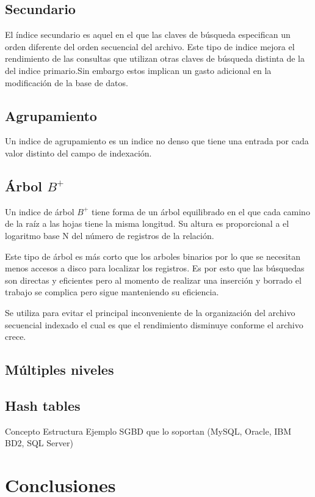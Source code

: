 \documentclass[12pt, titlepage]{article}
\begin{document}
	\subsection{Secundario}
	El índice secundario es aquel en el que las claves de búsqueda especifican un orden diferente del orden secuencial del archivo.
	Este tipo de indice mejora el rendimiento de las consultas que utilizan otras claves de búsqueda distinta de la del indice primario.Sin embargo estos implican un gasto adicional en la modificación de la base de datos.
	\subsection{Agrupamiento}
	Un indice de agrupamiento es un indice no denso que tiene una entrada por cada valor distinto del campo de indexación.
	\subsection{Árbol $B^{+}$}
	Un indice de árbol $B^{+}$ tiene forma de un árbol equilibrado en el que cada camino de la raíz a las hojas tiene la misma longitud. Su altura es proporcional a el logaritmo base N del número de registros de la relación.
	
	Este tipo de árbol es más corto que los arboles binarios por lo que se necesitan menos accesos a disco para localizar los registros. Es por esto que las búsquedas son directas y eficientes pero al momento de realizar una inserción y borrado el trabajo se complica pero sigue manteniendo su eficiencia.
	
	Se utiliza para evitar el principal inconveniente de la organización del archivo secuencial indexado el cual es que el rendimiento disminuye conforme el archivo crece.
	
	\subsection{Múltiples niveles}
	\subsection{Hash tables}
	
	Concepto
	Estructura
	Ejemplo
	SGBD que lo soportan (MySQL, Oracle, IBM BD2, SQL Server)
	\section{Conclusiones}
	 
	
\end{document}
